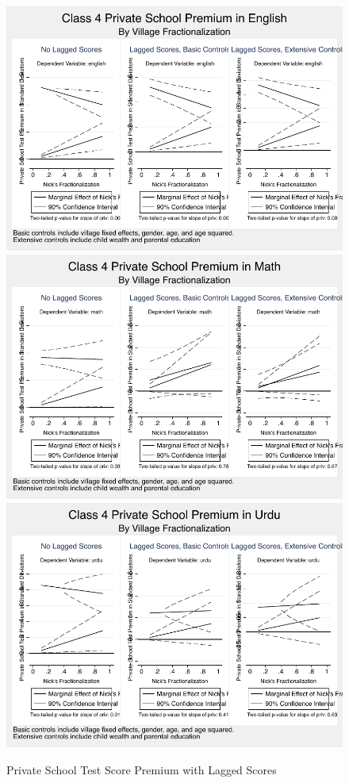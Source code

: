 \documentclass[12pt]{article}
\begin{document}
\begin{figure}[h]
	\caption{Private School Test Score Premium with Lagged Scores}\label{withlags}
	\centering	
	\includegraphics[scale=0.8]{graphs/twoyear_english.pdf} \includegraphics[scale=0.8]{graphs/twoyear_math.pdf}
	\includegraphics[scale=0.8]{graphs/twoyear_urdu.pdf}
\end{figure}
\end{document}
